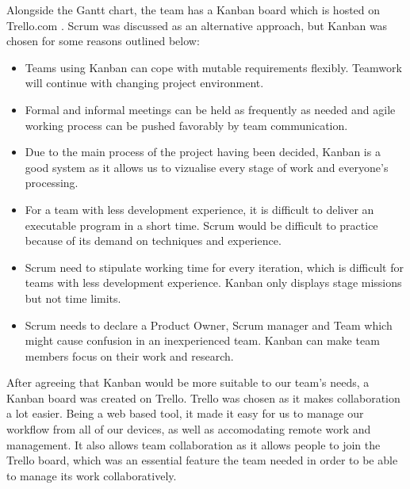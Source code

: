 \documentclass[titlepage]{article}
\begin{document}
\begin{figure}\label{ganttchart}
  
\end{figure}

Alongside the Gantt chart, the team has a Kanban board which is hosted on Trello.com \cite{trello}. Scrum was discussed as an alternative approach, but Kanban was chosen for some reasons outlined below:

\begin{itemize}
\item Teams using Kanban can cope with mutable requirements flexibly. Teamwork will continue with changing project environment.
\item Formal and informal meetings can be held as frequently as needed and agile working process can be pushed favorably by team communication.
\item Due to the main process of the project having been decided, Kanban is a good system as it allows us to vizualise every stage of work and everyone’s processing.
\item For a team with less development experience, it is difficult to deliver an executable program in a short time. Scrum would be difficult to practice because of its demand on techniques and experience.
\item Scrum need to stipulate working time for every iteration, which is difficult for teams with less development experience. Kanban only displays stage missions but not time limits.
\item Scrum needs to declare a Product Owner, Scrum manager and Team which might cause confusion in an inexperienced team. Kanban can make team members focus on their work and research.
\end{itemize}

After agreeing that Kanban would be more suitable to our team's needs, a Kanban board was created on Trello. Trello was chosen as it makes collaboration a lot easier. Being a web based tool, it made it easy for us to manage our workflow from all of our devices, as well as accomodating remote work and management. It also allows team collaboration as it allows people to join the Trello board, which was an essential feature the team needed in order to be able to manage its work collaboratively.
\end{document}
